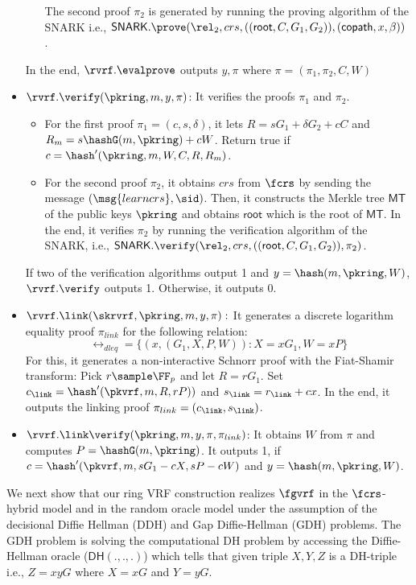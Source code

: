 \begin{itemize}
\begin{itemize}
		The second proof $ \pi_2 $ is generated by running the proving algorithm of the SNARK i.e., $ \mathsf{SNARK}.\prove(\rel_2, crs,((\mathsf{root}, C, G_1, G_2)), (\mathsf{copath}, x, \beta)) $ \cite{groth16}.
	\end{itemize}
		In the end, $ \rvrf.\evalprove $ outputs $ y, \pi  $ where $ \pi = (\pi_1, \pi_2, C, W) $
	\item $ \rvrf.\verify(\pkring, m, y, \pi) $: It verifies the proofs $ \pi_1 $ and $ \pi_2 $.
	\begin{itemize}
		\item For the first proof $ \pi_1 = (c,s, \delta) $, it lets $R = s G_1 + \delta G_2 + c C$ and $R_m = s \hashG(m, \pkring) + c W$.
		Return true if $c = \hash'(\pkring,m,W,C,R,R_m)$.
		\item For the second proof $ \pi_2 $, it obtains $ crs $ from $ \fcrs $ by sending the message $ (\msg{learncrs}, \sid) $. Then, it constructs the Merkle tree $ \mathsf{MT} $ of the public keys $ \pkring $ and obtains $ \mathsf{root} $ which is the root of $ \mathsf{MT} $. In the end, it verifies $ \pi_2 $ by running the verification algorithm of the SNARK, i.e., $ \mathsf{SNARK}.\verify(\rel_2,crs, ((\mathsf{root}, C, G_1, G_2)), \pi_2) $.
	\end{itemize}
	If two of the verification algorithms output 1 and $ y =  \hash(m, \pkring,W)  $, $  \rvrf.\verify $ outputs 1. Otherwise, it outputs 0.
	\item $ \rvrf.\link(\skrvrf, \pkring, m, y,\pi): $ It generates a discrete logarithm equality proof $ \pi_{link} $ for the following relation:
	$$\rel_{dleq} = \{(x, (G_1, X,P,W)): X = xG_1, W = xP\}$$
	For this, it generates a non-interactive Schnorr proof with the Fiat-Shamir transform:  Pick $ r \sample \FF_p $ and let $ R = rG_1 $. Set $ c_\link = \hash'( \pkvrf,m,R,rP)) $ and $ s_\link = r_\link + cx $. In the end, it outputs the linking proof $ \pi_{link} = (c_\link,s_\link) $.
	\item $ \rvrf.\link\verify(\pkring, m, y, \pi, \pi_{link}) $: It obtains $ W $ from $ \pi $ and computes $ P = \hashG(m, \pkring) $. It outputs 1, if $ c = \hash'(\pkvrf,m, sG_1 - cX, sP-cW) $ and $ y = \hash(m, \pkring,W) $.
\end{itemize}


We next show that our ring VRF construction realizes $ \fgvrf $ in the $ \fcrs $-hybrid model and in the random oracle model under the assumption of the decisional Diffie Hellman (DDH) and Gap Diffie-Hellman (GDH) problems. The GDH problem is solving the computational DH problem by accessing the Diffie-Hellman oracle ($ \mathsf{DH}(.,.,.) $) which tells that given triple $ X,Y,Z $ is a DH-triple i.e., $ Z = xyG $ where $ X = xG $ and $ Y = yG $.

